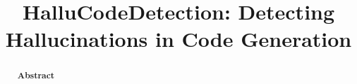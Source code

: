 \documentclass{sbc2019}
\begin{document}
\title[HalluCodeDetection]{HalluCodeDetection: Detecting Hallucinations in Code Generation}

\author[de Lima]{
}

\begin{frontmatter}
\maketitle

\begin{abstract}
\textbf{Abstract}

\end{abstract}
\end{frontmatter}
\end{document}
